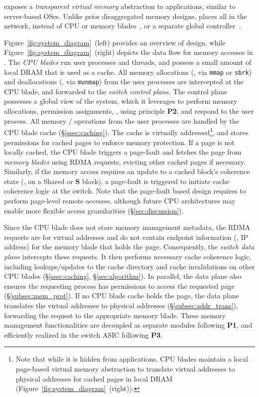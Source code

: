 \mind exposes a \textit{transparent virtual memory} abstraction to applications, similar to server-based OSes. Unlike prior disaggregated memory designs, \mind places all \mmm in the network, instead of CPU or memory blades~\cite{infiniswap, fastswap}, or a separate global controller~\cite{legoos}. 

Figure~\ref{fig:system_diagram}~(left) provides an overview of \mind design, while Figure~\ref{fig:system_diagram}~(right) depicts the data flow for memory accesses in \mind. The \textit{CPU blades} run user processes and threads, and possess a small amount of local DRAM that is used as a cache. All memory allocations (\eg, via \texttt{mmap} or \texttt{sbrk}) and deallocations (\eg, via \texttt{munmap}) from the user processes are intercepted at the CPU blade, and forwarded to the \textit{switch control plane}. The control plane possesses a global view of the system, which it leverages to perform memory allocations, permission assignments, \etc, using principle \textbf{P2}, and respond to the user process. All memory / operations from the user processes are handled by the CPU blade cache (\S\ref{ssec:caching}). The cache is virtually addressed\footnote{Note that while it is hidden from applications, CPU blades maintain a local page-based virtual memory abstraction to translate \mind virtual addresses to physical addresses for cached pages in local DRAM (Figure~\ref{fig:system_diagram}~(right)).}, and stores permissions for cached pages to enforce memory protection. If a page is not locally cached, the CPU blade triggers a page-fault and fetches the page from \textit{memory blades} using RDMA requests, evicting other cached pages if necessary. Similarly, if the memory access requires an update to a cached block's coherence state (\eg,  on a Shared or \textbf{S} block), a page-fault is triggered to initiate cache coherence logic at the switch. Note that the page-fault based design requires \mind to perform page-level remote accesses, although future CPU architectures may enable more flexible access granularities (\S\ref{sec:discussion}).

Since the CPU blade does not store memory management metadata, the RDMA requests are for virtual addresses and do not contain endpoint information (\eg, IP address) for the memory blade that holds the page. Consequently, the \textit{switch data plane} intercepts these requests. It then performs necessary cache coherence logic, including lookups/updates to the cache directory and cache invalidations on other CPU blades (\S\ref{ssec:caching}, \S\ref{sec:algorithm}). In parallel, the data plane also ensures the requesting process has permissions to access the requested page (\S\ref{subsec:mem_prot}). If no CPU blade cache holds the page, the data plane translates the virtual addresses to physical addresses (\S\ref{subsec:addr_trans}), forwarding the request to the appropriate memory blade. These memory management functionalities are decoupled as separate modules following \textbf{P1}, and efficiently realized in the switch ASIC following \textbf{P3}.

